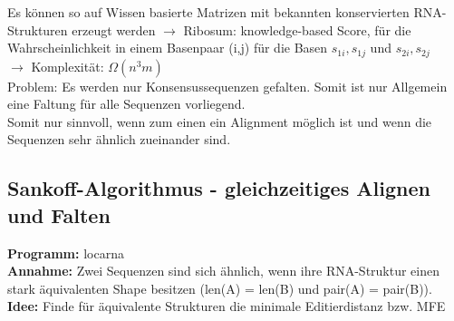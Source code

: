 Es können so auf Wissen basierte Matrizen mit bekannten konservierten RNA-Strukturen erzeugt werden
$\rightarrow$ Ribosum: knowledge-based Score, für die Wahrscheinlichkeit in einem Basenpaar (i,j) für die Basen $s_{1i}, s_{1j}$ und $s_{2i}, s_{2j}$ \\

$\rightarrow$ Komplexität: $\Omega(n^{3}m)$ \\

Problem: Es werden nur Konsensussequenzen gefalten. Somit ist nur Allgemein eine Faltung für alle Sequenzen vorliegend. \\
Somit nur sinnvoll, wenn zum einen ein Alignment möglich ist und wenn die Sequenzen sehr ähnlich zueinander sind.

\subsection{Sankoff-Algorithmus - gleichzeitiges Alignen und Falten}

\textbf{Programm:} locarna \\

\textbf{Annahme:} Zwei Sequenzen sind sich ähnlich, wenn ihre RNA-Struktur einen stark äquivalenten Shape besitzen (len(A) = len(B) und pair(A) = pair(B)).\\

\textbf{Idee:} Finde für äquivalente Strukturen die minimale Editierdistanz  bzw. MFE \\

